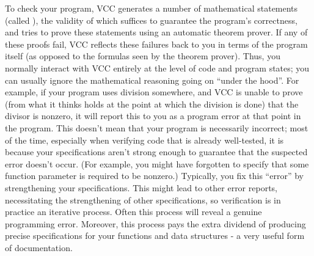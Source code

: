 To check your program, VCC generates a number of mathematical
statements (called ), the validity of
which suffices to guarantee the program's correctness, and tries to
prove these statements using an automatic theorem prover. If any of
these proofs fail, VCC reflects these failures back to you in terms of
the program itself (as opposed to the formulas seen by the theorem
prover). Thus, you normally interact with VCC entirely at the level of
code and program states; you can usually ignore the mathematical
reasoning going on ``under the hood''.
For example, if your program uses division
somewhere, and VCC is unable to prove (from what it thinks holds at the
point at which the division is done) that the divisor is nonzero, it
will report this to you as a program error at that point in the
program. 
This doesn't mean that your program is necessarily incorrect;
most of the time, especially when verifying code that is already well-tested,
it is because your specifications aren't strong
enough to guarantee that the suspected error doesn't occur.
(For example, you might have forgotten to specify that some function
parameter is required to be nonzero.)
Typically, you fix this ``error'' by strengthening your
specifications. This might lead to other error reports, necessitating
the strengthening of other specifications, so verification is in
practice an iterative process.  
Often this process will reveal a genuine programming error.
Moreover, this process pays the extra dividend of producing precise
specifications for your functions and data structures - a very useful
form of documentation. 



